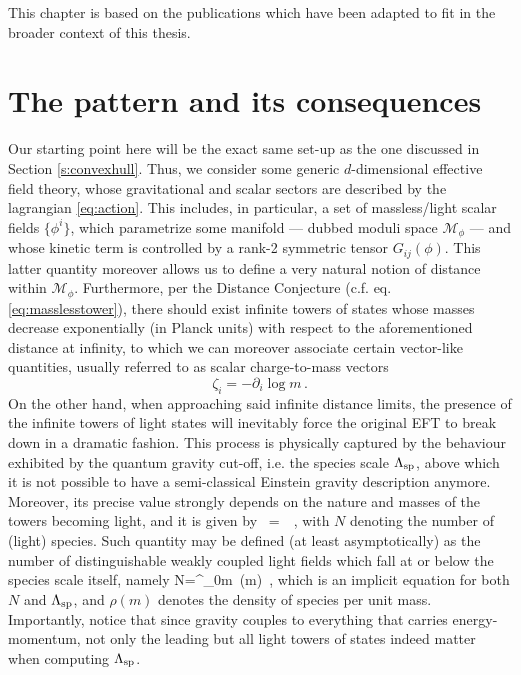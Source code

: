 This chapter is based on the publications \cite{PhysRevLett.132.181601,Castellano:2023jjt} which have been adapted to fit in the broader context of this thesis.


\section{The pattern and its consequences}
\label{s:patternintro}

Our starting point here will be the exact same set-up as the one discussed in Section \ref{s:convexhull}. Thus, we consider some generic $d$-dimensional effective field theory, whose gravitational and scalar sectors are described by the lagrangian \eqref{eq:action}. This includes, in particular, a set of massless/light scalar fields $\{ \phi^i\}$, which parametrize some manifold --- dubbed moduli space $\mathcal{M}_{\phi}$ --- and whose kinetic term is controlled by a rank-2 symmetric tensor $G_{ij}(\phi)$. This latter quantity moreover allows us to define a very natural notion of distance within $\mathcal{M}_{\phi}$. Furthermore, per the Distance Conjecture (c.f. eq. \eqref{eq:masslesstower}), there should exist infinite towers of states whose masses decrease exponentially (in Planck units) with respect to the aforementioned distance at infinity, to which we can moreover associate certain vector-like quantities, usually referred to as scalar charge-to-mass vectors
%
\begin{equation}\label{eq:chargetomass2}
	\zeta_i = -\partial_i \log m\, .
\end{equation}
%	
On the other hand, when approaching said infinite distance limits, the presence of the infinite towers of light states will inevitably force the original EFT to break down in a dramatic fashion. This process is physically captured by the behaviour exhibited by the quantum gravity cut-off, i.e. the species scale $\Lambda_{\text{sp}}$, above which it is not possible to have a semi-classical Einstein gravity description anymore. Moreover, its precise value strongly depends on the nature and masses of the towers becoming light, and it is given by
%
\beq
\label{LSP}
	\LSP\, =\, \, ,
\eeq
%
with $N$ denoting the number of (light) species. Such quantity may be defined (at least asymptotically) as the number of distinguishable weakly coupled light fields which fall at or below the species scale itself, namely
%
\beq
\label{NSP}
	N=\int^{\LSP}_0\dd m\, \rho(m)\, ,
\eeq
%
which is an implicit equation for both $N$ and $\Lambda_{\text{sp}}$, and $\rho(m)$ denotes the density of species per unit mass. Importantly, notice that since gravity couples to everything that carries energy-momentum, not only the leading but all light towers of states indeed matter when computing $\Lambda_{\text{sp}}$. 
	
